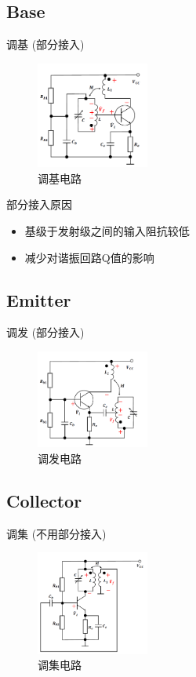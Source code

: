 \documentclass[a4paper]{report}
\begin{document}
\subsection{Base}
调基 (部分接入)
\begin{figure}[H]
\centering
\includegraphics[width=0.33\textwidth]{osc_lc_base.png}
\caption{调基电路}
\end{figure}
部分接入原因
\begin{itemize}
  \item 基级于发射级之间的输入阻抗较低
  \item 减少对谐振回路Q值的影响
\end{itemize}

\subsection{Emitter}
调发 (部分接入)
\begin{figure}[H]
  \centering
  \includegraphics[width=0.33\textwidth]{osc_lc_emitter.png}
  \caption{调发电路}
  \end{figure}
\subsection{Collector}
调集 (不用部分接入)
\begin{figure}[H]
  \centering
  \includegraphics[width=0.33\textwidth]{osc_lc_collector.png}
  \caption{调集电路}
  \end{figure}
\end{document}
